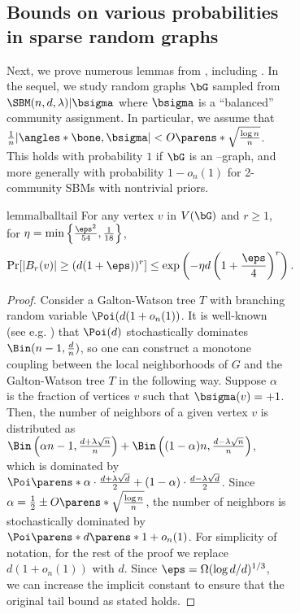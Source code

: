 \documentclass[11pt,letterpaper]{article}
\begin{document}
\begin{figure}
\begin{figure}
\subsection{Bounds on various probabilities in sparse random graphs}

Next, we prove numerous lemmas from , including .
In the sequel, we study random graphs $\bG$ sampled from $\SBM(n,d,\lambda)|\bsigma$ where $\bsigma$ is a ``balanced'' community assignment.
In particular, we assume that $\frac{1}{n}|\angles*{\bone,\bsigma}|<O\parens*{\sqrt{\frac{\log n}{n}}}$.
This holds with probability $1$ if $\bG$ is an \erdos--\renyi graph, and more generally with probability $1 - o_n(1)$ for 2-community SBMs with nontrivial priors.

\begin{restatable}{lemma}{lballtail}
    \label{lem:ball-tail}
    For any vertex $v$ in $V(\bG)$ and $r \ge 1$, for $\eta = \min\left\{ \frac{\eps^2}{54} , \frac{1}{18} \right\}$,
    \[
        \Pr[ |B_r(v)| \ge (d(1+\eps))^r] \le \exp\left( - \eta d \left( 1 + \frac{\eps}{4} \right)^{r} \right).
    \]
\end{restatable}

\begin{proof}
    Consider a Galton-Watson tree $T$ with branching random variable $\Poi(d(1+o_n(1))$. It is well-known (see e.g. \cite[Example 4.2.8]{Roch24}) that $\Poi(d)$ stochastically dominates $\Bin(n-1, \frac{d}{n})$, so one can construct a monotone coupling between the local neighborhoods of $G$ and the Galton-Watson tree $T$ in the following way.
    Suppose $\alpha$ is the fraction of vertices $v$ such that $\bsigma(v) = +1$.
    Then, the number of neighbors of a given vertex $v$ is distributed as $\Bin\left(\alpha n - 1, \frac{d+\lambda\sqrt{n}}{n}\right) + \Bin\left((1-\alpha)n, \frac{d-\lambda\sqrt{n}}{n} \right)$, which is dominated by $\Poi\parens*{\alpha\cdot\frac{d+\lambda \sqrt{d}}{2} + (1-\alpha)\cdot\frac{d-\lambda\sqrt{d}}{2}}$.
    Since $\alpha = \frac{1}{2}\pm O\parens*{\sqrt{\frac{\log n}{n}}}$, the number of neighbors is stochastically dominated by $\Poi\parens*{d\parens*{1 + o_n(1)}}$. 
    For simplicity of notation, for the rest of the proof we replace $d(1+o_n(1))$ with $d$. 
    Since $\eps = \Omega(\log d/d)^{1/3}$, we can increase the implicit constant to ensure that the original tail bound as stated holds.


\end{proof}
\end{figure}
\end{figure}
\end{document}
